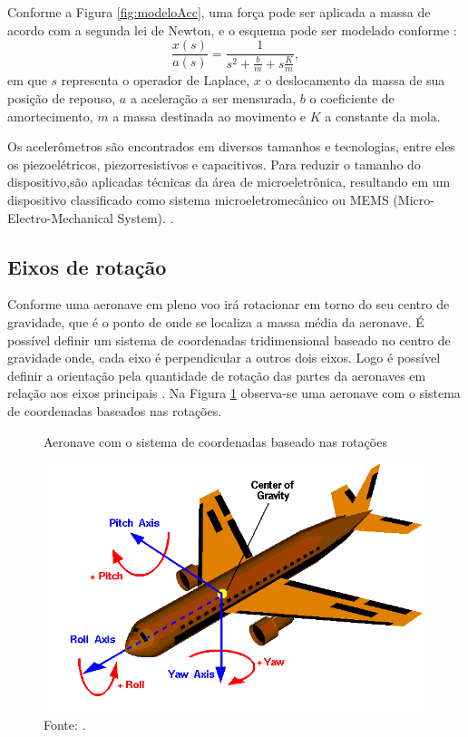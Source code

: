 	Conforme a Figura \ref{fig:modeloAcc}, uma força pode ser aplicada a massa de acordo com a segunda lei de Newton, e o esquema pode ser modelado conforme \cite{INSTRUME}:
	\begin{equation}
		\frac{x(s)}{a(s)} = \frac{1}{ 	s^2 + \frac{b}{m} + s\frac{K}{m}},
		\label{eq:laplace}
	\end{equation}
	em que $s$ representa o operador de Laplace, $x$ o deslocamento da massa de sua posição de repouso, $a$ a aceleração a ser mensurada, $b$ o coeficiente de amortecimento, $m$ a massa destinada ao movimento e $K$ a constante da mola.
	
	Os acelerômetros são encontrados em diversos tamanhos e tecnologias, entre eles os piezoelétricos, piezorresistivos e capacitivos. Para reduzir o tamanho do dispositivo,são aplicadas técnicas da área de microeletrônica, resultando em um dispositivo classificado como sistema
	microeletromecânico ou MEMS (Micro-Electro-Mechanical System). \cite{INSTRUME}.

	\subsection{Eixos de rotação}
Conforme  uma aeronave em pleno voo irá rotacionar em torno do seu centro de gravidade, que é o ponto de onde se localiza a massa média da aeronave. É possível definir um sistema de coordenadas tridimensional baseado no centro de gravidade onde, cada eixo é perpendicular a outros dois eixos. Logo é possível definir a orientação pela quantidade de rotação das partes da aeronaves em relação aos eixos principais \cite{NASA}. Na Figura \ref{fig:rotations} observa-se uma aeronave com o sistema de coordenadas baseados nas rotações.
        
        \begin{figure}[H]
        	\vspace{4mm}
            \centering
            \caption{Aeronave com o sistema de coordenadas baseado nas rotações}
            \label{fig:rotations}
            \includegraphics[scale=0.5]{imagens/rotations.png}

            \caption*{Fonte: .}

        \end{figure}
        

